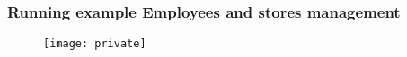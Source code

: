 \begin{frame}
\frametitle{Running example \newline Employees and stores management}
\begin{center}
	\begin{figure}
	\texttt{[image: private]}
	\end{figure}
\end{center}
\end{frame}